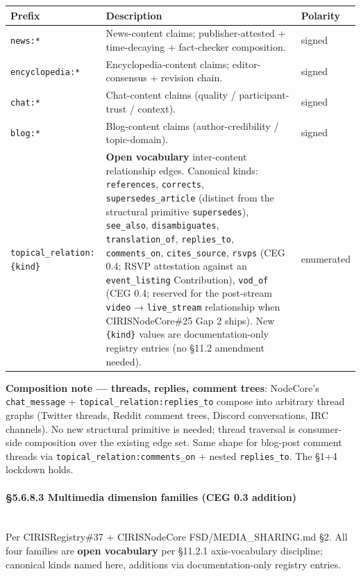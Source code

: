 \documentclass[10pt]{article}
\begin{document}
{\footnotesize
\begin{longtable}{|p{5.33cm}|p{5.33cm}|p{5.33cm}|}\hline
\textbf{Prefix} & \textbf{Description} & \textbf{Polarity} \\ \hline\endhead
\texttt{news:*} & News-content claims; publisher-attested + time-decaying + fact-checker composition. & signed \\ \hline
\texttt{encyclopedia:*} & Encyclopedia-content claims; editor-consensus + revision chain. & signed \\ \hline
\texttt{chat:*} & Chat-content claims (quality / participant-trust / context). & signed \\ \hline
\texttt{blog:*} & Blog-content claims (author-credibility / topic-domain). & signed \\ \hline
\texttt{topical\_relation:\{kind\}} & \textbf{Open vocabulary} inter-content relationship edges. Canonical kinds: \texttt{references}, \texttt{corrects}, \texttt{supersedes\_article} (distinct from the structural primitive \texttt{supersedes}), \texttt{see\_also}, \texttt{disambiguates}, \texttt{translation\_of}, \texttt{replies\_to}, \texttt{comments\_on}, \texttt{cites\_source}, \texttt{rsvps} (CEG 0.4; RSVP attestation against an \texttt{event\_listing} Contribution), \texttt{vod\_of} (CEG 0.4; reserved for the post-stream \texttt{video} → \texttt{live\_stream} relationship when CIRISNodeCore\#25 Gap 2 ships). New \texttt{\{kind\}} values are documentation-only registry entries (no §11.2 amendment needed). & enumerated \\ \hline
\end{longtable}}


\textbf{Composition note — threads, replies, comment trees}: NodeCore's \texttt{chat\_message} + \texttt{topical\_relation:replies\_to} compose into arbitrary thread graphs (Twitter threads, Reddit comment trees, Discord conversations, IRC channels). No new structural primitive is needed; thread traversal is consumer-side composition over the existing edge set. Same shape for blog-post comment threads via \texttt{topical\_relation:comments\_on} + nested \texttt{replies\_to}. The §1+4 lockdown holds.


\paragraph{§5.6.8.3 Multimedia dimension families (CEG 0.3 addition)}\mbox{}\\


Per CIRISRegistry\#37 + CIRISNodeCore FSD/MEDIA\_SHARING.md §2. All four families are \textbf{open vocabulary} per §11.2.1 axis-vocabulary discipline; canonical kinds named here, additions via documentation-only registry entries.
\end{document}
